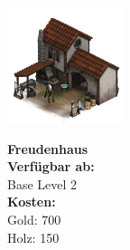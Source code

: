 \documentclass{scrartcl}
\begin{document}
\begin{minipage}{0.3\textwidth}
	\includegraphics[width=\textwidth]{imgBrothel.png}
\end{minipage}
\hfill
\begin{minipage}{0.5\textwidth}
	\textbf{Freudenhaus}\\
	
	\textbf{Verfügbar ab: }\\ Base Level 2\\
	\textbf{Kosten:
	}\\
	Gold: 700 \\
	Holz: 150\\
	
\end{minipage}
\end{document}
